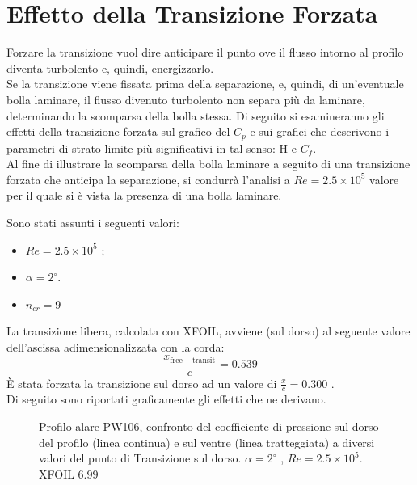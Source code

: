 \section{Effetto della Transizione Forzata}
Forzare la transizione vuol dire anticipare il punto ove il flusso intorno al profilo diventa turbolento e, quindi, energizzarlo.\\
Se la transizione viene fissata prima della separazione, e, quindi, di un’eventuale bolla laminare, il flusso divenuto turbolento non separa più da laminare, determinando la scomparsa della bolla stessa.
Di seguito si esamineranno gli effetti della transizione forzata sul grafico del $C_p$ e sui grafici che descrivono i parametri di strato limite più significativi in tal senso: H e $C_f$.\\
Al fine di illustrare la scomparsa della bolla laminare a seguito di una transizione forzata che anticipa la separazione, si condurrà l’analisi a $Re=2.5\times10^5$ valore per il quale si è vista la presenza di una bolla laminare.

Sono stati assunti i seguenti valori:
\begin {itemize}
\item $Re=2.5\times10^5  $ ;
\item $ \alpha=2^\circ$.
\item $n_{cr}=9$
\end{itemize}
La transizione libera, calcolata con XFOIL, avviene (sul dorso) al seguente valore dell'ascissa adimensionalizzata con la corda: 
\begin{equation}
\frac{x_\mathrm{free-transit}}{c}= 0.539
\end {equation}
\noindent
È stata forzata la transizione sul dorso ad un valore di ${\frac{x}{c}}=0.300$ .\\
Di seguito sono riportati graficamente gli effetti che ne derivano.
\begin{figure} [H]
\centering
{}
\caption{\footnotesize Profilo alare PW106, confronto del coefficiente di pressione sul dorso del profilo (linea continua) e sul ventre (linea tratteggiata) a diversi valori del punto di Transizione sul dorso.  $ \alpha=2^\circ$ , $ Re= 2.5\times10^5$. XFOIL 6.99}\label{fig:caso}
\end{figure}
\noindent

